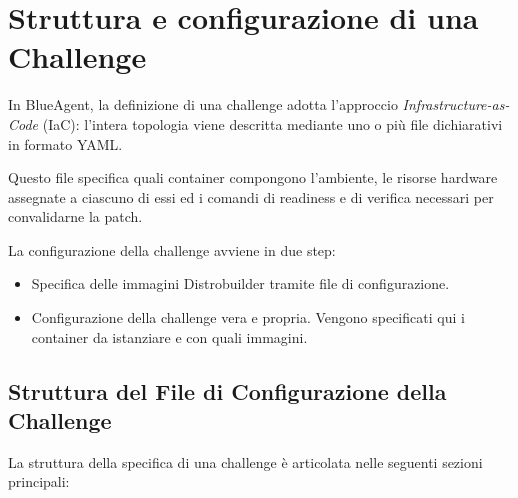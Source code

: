 \section{Struttura e configurazione di una
Challenge}\label{struttura-e-configurazione-di-una-challenge}

In BlueAgent, la definizione di una challenge adotta l'approccio
\emph{Infrastructure-as-Code} (IaC): l'intera topologia viene descritta
mediante uno o più file dichiarativi in formato YAML.

Questo file specifica quali container compongono l'ambiente, le risorse
hardware assegnate a ciascuno di essi ed i comandi di readiness e di
verifica necessari per convalidarne la patch.

La configurazione della challenge avviene in due step:

\begin{itemize}
\tightlist
\item
  Specifica delle immagini Distrobuilder tramite file di configurazione.
\item
  Configurazione della challenge vera e propria. Vengono specificati qui
  i container da istanziare e con quali immagini.
\end{itemize}

\subsection{Struttura del File di Configurazione della
Challenge}\label{struttura-del-file-di-configurazione-della-challenge}

La struttura della specifica di una challenge è articolata nelle
seguenti sezioni principali:

